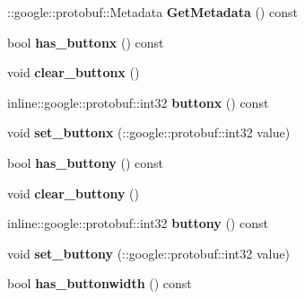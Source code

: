 \begin{DoxyCompactItemize}
\item 
\hypertarget{class_game_menu_aac2d5a1cf8855aa80e4e72a53397b396}{\-::google\-::protobuf\-::\-Metadata {\bfseries Get\-Metadata} () const }\label{class_game_menu_aac2d5a1cf8855aa80e4e72a53397b396}

\item 
\hypertarget{class_game_menu_a0f1d555993fae1f4bb4610de51082169}{bool {\bfseries has\-\_\-buttonx} () const }\label{class_game_menu_a0f1d555993fae1f4bb4610de51082169}

\item 
\hypertarget{class_game_menu_a200f23f0a7b562455ba4e0fe418bd751}{void {\bfseries clear\-\_\-buttonx} ()}\label{class_game_menu_a200f23f0a7b562455ba4e0fe418bd751}

\item 
\hypertarget{class_game_menu_aea17fc7a000f75a96a4b1b26dfd76778}{inline\-::google\-::protobuf\-::int32 {\bfseries buttonx} () const }\label{class_game_menu_aea17fc7a000f75a96a4b1b26dfd76778}

\item 
\hypertarget{class_game_menu_a5fdecafb0ddc1119cca7111d796ca4b1}{void {\bfseries set\-\_\-buttonx} (\-::google\-::protobuf\-::int32 value)}\label{class_game_menu_a5fdecafb0ddc1119cca7111d796ca4b1}

\item 
\hypertarget{class_game_menu_aa081759411b7f4df72b589ca69fc00b2}{bool {\bfseries has\-\_\-buttony} () const }\label{class_game_menu_aa081759411b7f4df72b589ca69fc00b2}

\item 
\hypertarget{class_game_menu_afc095342e5c7f7231d70eb99c522bbfb}{void {\bfseries clear\-\_\-buttony} ()}\label{class_game_menu_afc095342e5c7f7231d70eb99c522bbfb}

\item 
\hypertarget{class_game_menu_aa680aff8de83627d3659f5354fdbfa8e}{inline\-::google\-::protobuf\-::int32 {\bfseries buttony} () const }\label{class_game_menu_aa680aff8de83627d3659f5354fdbfa8e}

\item 
\hypertarget{class_game_menu_a5012a247ded2ab16c4d0e9760aecbee1}{void {\bfseries set\-\_\-buttony} (\-::google\-::protobuf\-::int32 value)}\label{class_game_menu_a5012a247ded2ab16c4d0e9760aecbee1}

\item 
\hypertarget{class_game_menu_af2a429e3dea81aefb27e507b34a6b450}{bool {\bfseries has\-\_\-buttonwidth} () const }\label{class_game_menu_af2a429e3dea81aefb27e507b34a6b450}


\end{DoxyCompactItemize}
